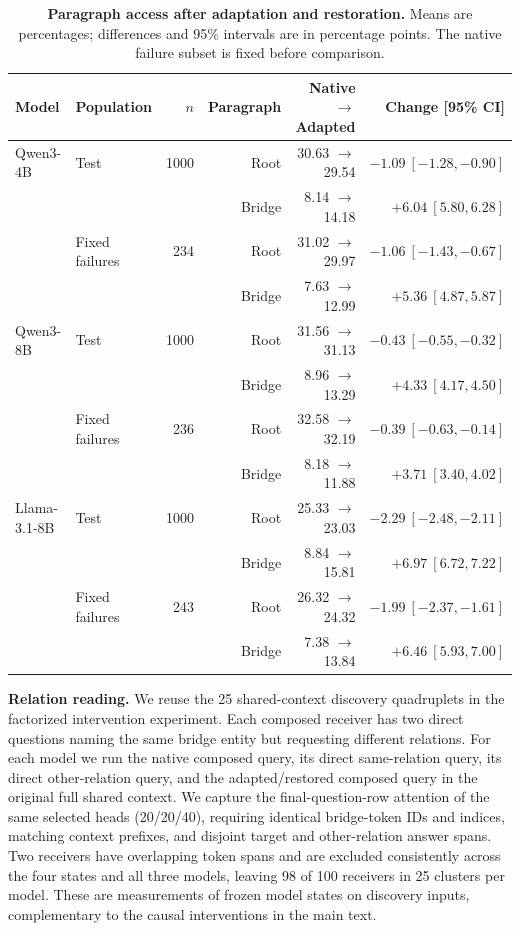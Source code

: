 \begin{table}[!htbp]
\centering
\caption{\textbf{Paragraph access after adaptation and restoration.} Means are percentages; differences and 95\% intervals are in percentage points. The native failure subset is fixed before comparison.}
\label{tab:postrepair_routing}
\small
\begin{tabular}{llrrrr}
\toprule
Model & Population & $n$ & Paragraph & Native $\to$ Adapted & Change [95\% CI] \\
\midrule
Qwen3-4B & Test & 1000 & Root & 30.63 $\to$ 29.54 & $-1.09\ [-1.28,-0.90]$ \\
 & & & Bridge & 8.14 $\to$ 14.18 & $+6.04\ [5.80,6.28]$ \\
 & Fixed failures & 234 & Root & 31.02 $\to$ 29.97 & $-1.06\ [-1.43,-0.67]$ \\
 & & & Bridge & 7.63 $\to$ 12.99 & $+5.36\ [4.87,5.87]$ \\
\midrule
Qwen3-8B & Test & 1000 & Root & 31.56 $\to$ 31.13 & $-0.43\ [-0.55,-0.32]$ \\
 & & & Bridge & 8.96 $\to$ 13.29 & $+4.33\ [4.17,4.50]$ \\
 & Fixed failures & 236 & Root & 32.58 $\to$ 32.19 & $-0.39\ [-0.63,-0.14]$ \\
 & & & Bridge & 8.18 $\to$ 11.88 & $+3.71\ [3.40,4.02]$ \\
\midrule
Llama-3.1-8B & Test & 1000 & Root & 25.33 $\to$ 23.03 & $-2.29\ [-2.48,-2.11]$ \\
 & & & Bridge & 8.84 $\to$ 15.81 & $+6.97\ [6.72,7.22]$ \\
 & Fixed failures & 243 & Root & 26.32 $\to$ 24.32 & $-1.99\ [-2.37,-1.61]$ \\
 & & & Bridge & 7.38 $\to$ 13.84 & $+6.46\ [5.93,7.00]$ \\
\bottomrule
\end{tabular}
\end{table}

\textbf{Relation reading.} We reuse the 25 shared-context discovery quadruplets in the factorized intervention experiment. Each composed receiver has two direct questions naming the same bridge entity but requesting different relations. For each model we run the native composed query, its direct same-relation query, its direct other-relation query, and the adapted/restored composed query in the original full shared context. We capture the final-question-row attention of the same selected heads (20/20/40), requiring identical bridge-token IDs and indices, matching context prefixes, and disjoint target and other-relation answer spans. Two receivers have overlapping token spans and are excluded consistently across the four states and all three models, leaving 98 of 100 receivers in 25 clusters per model. These are measurements of frozen model states on discovery inputs, complementary to the causal interventions in the main text.


